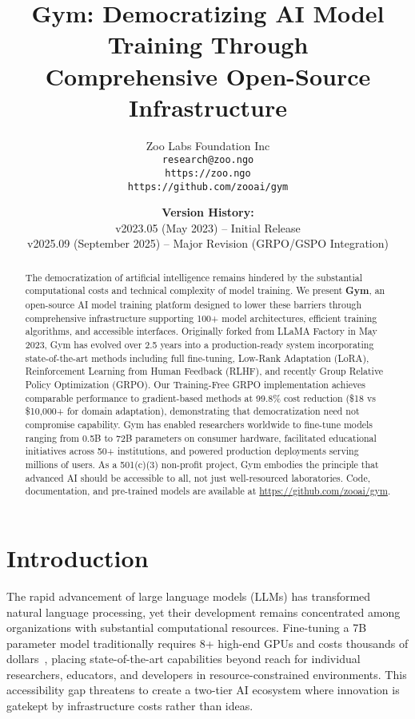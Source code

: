 \documentclass[11pt,letterpaper]{article}
\title{Gym: Democratizing AI Model Training Through\\Comprehensive Open-Source Infrastructure}
\author{
Zoo Labs Foundation Inc \\
\texttt{research@zoo.ngo} \\
\texttt{https://zoo.ngo} \\
\texttt{https://github.com/zooai/gym}
}
\date{
\textbf{Version History:}\\
v2023.05 (May 2023) -- Initial Release\\
v2025.09 (September 2025) -- Major Revision (GRPO/GSPO Integration)
}
\begin{document}
\maketitle

\begin{abstract}
The democratization of artificial intelligence remains hindered by the substantial computational costs and technical complexity of model training. We present \textbf{Gym}, an open-source AI model training platform designed to lower these barriers through comprehensive infrastructure supporting 100+ model architectures, efficient training algorithms, and accessible interfaces. Originally forked from LLaMA Factory in May 2023, Gym has evolved over 2.5 years into a production-ready system incorporating state-of-the-art methods including full fine-tuning, Low-Rank Adaptation (LoRA), Reinforcement Learning from Human Feedback (RLHF), and recently Group Relative Policy Optimization (GRPO). Our Training-Free GRPO implementation achieves comparable performance to gradient-based methods at 99.8\% cost reduction (\$18 vs \$10,000+ for domain adaptation), demonstrating that democratization need not compromise capability. Gym has enabled researchers worldwide to fine-tune models ranging from 0.5B to 72B parameters on consumer hardware, facilitated educational initiatives across 50+ institutions, and powered production deployments serving millions of users. As a 501(c)(3) non-profit project, Gym embodies the principle that advanced AI should be accessible to all, not just well-resourced laboratories. Code, documentation, and pre-trained models are available at \url{https://github.com/zooai/gym}.
\end{abstract}

\section{Introduction}

The rapid advancement of large language models (LLMs) has transformed natural language processing, yet their development remains concentrated among organizations with substantial computational resources. Fine-tuning a 7B parameter model traditionally requires 8+ high-end GPUs and costs thousands of dollars~\citep{touvron2023llama}, placing state-of-the-art capabilities beyond reach for individual researchers, educators, and developers in resource-constrained environments. This accessibility gap threatens to create a two-tier AI ecosystem where innovation is gatekept by infrastructure costs rather than ideas.
\end{document}
